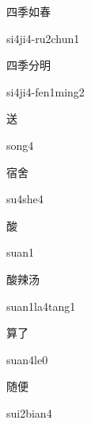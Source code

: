 \begin{multicols*}{2}
\begin{verbete}[si4ji4-ru2chun1]{四季如春}
\begin{pronuncia}{si4ji4-ru2chun1}
\end{pronuncia}
\end{verbete}

\begin{verbete}{四季分明}
\begin{pronuncia}{si4ji4-fen1ming2}
\end{pronuncia}
\end{verbete}

\begin{verbete}[song4]{送}
\begin{pronuncia}{song4}
\end{pronuncia}
\end{verbete}

\begin{verbete}[su4she4]{宿舍}
\begin{pronuncia}{su4she4}
\end{pronuncia}
\end{verbete}

\begin{verbete}[suan1]{酸}
\begin{pronuncia}{suan1}
\end{pronuncia}
\end{verbete}

\begin{verbete}{酸辣汤}
\begin{pronuncia}{suan1la4tang1}
\end{pronuncia}
\end{verbete}

\begin{verbete}[suan4le0]{算了}
\begin{pronuncia}{suan4le0}
\end{pronuncia}
\end{verbete}

\begin{verbete}{随便}
\begin{pronuncia}{sui2bian4}
\end{pronuncia}
\end{verbete}


\end{multicols*}
